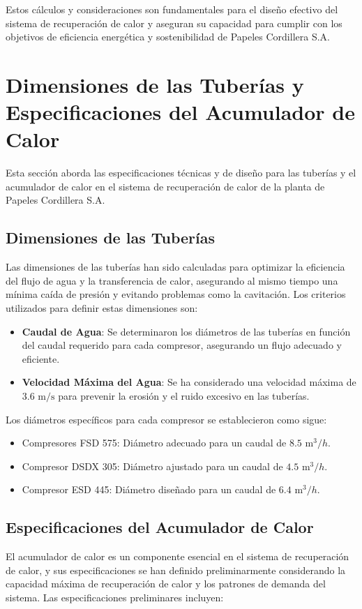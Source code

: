 \documentclass[11pt,a4paper]{article}  %
\begin{document}
Estos cálculos y consideraciones son fundamentales para el diseño efectivo del sistema de recuperación de calor y aseguran su capacidad para cumplir con los objetivos de eficiencia energética y sostenibilidad de Papeles Cordillera S.A.

\section{Dimensiones de las Tuberías y Especificaciones del Acumulador de Calor}

Esta sección aborda las especificaciones técnicas y de diseño para las tuberías y el acumulador de calor en el sistema de recuperación de calor de la planta de Papeles Cordillera S.A.

\subsection{Dimensiones de las Tuberías}
Las dimensiones de las tuberías han sido calculadas para optimizar la eficiencia del flujo de agua y la transferencia de calor, asegurando al mismo tiempo una mínima caída de presión y evitando problemas como la cavitación. Los criterios utilizados para definir estas dimensiones son:

\begin{itemize}
    \item \textbf{Caudal de Agua}: Se determinaron los diámetros de las tuberías en función del caudal requerido para cada compresor, asegurando un flujo adecuado y eficiente.
    \item \textbf{Velocidad Máxima del Agua}: Se ha considerado una velocidad máxima de \(3.6 \text{ m/s}\) para prevenir la erosión y el ruido excesivo en las tuberías.
\end{itemize}

Los diámetros específicos para cada compresor se establecieron como sigue:
\begin{itemize}
    \item Compresores FSD 575: Diámetro adecuado para un caudal de \(8.5 \text{ m}^3/h\).
    \item Compresor DSDX 305: Diámetro ajustado para un caudal de \(4.5 \text{ m}^3/h\).
    \item Compresor ESD 445: Diámetro diseñado para un caudal de \(6.4 \text{ m}^3/h\).
\end{itemize}

\subsection{Especificaciones del Acumulador de Calor}
El acumulador de calor es un componente esencial en el sistema de recuperación de calor, y sus especificaciones se han definido preliminarmente considerando la capacidad máxima de recuperación de calor y los patrones de demanda del sistema. Las especificaciones preliminares incluyen:
\end{document}
